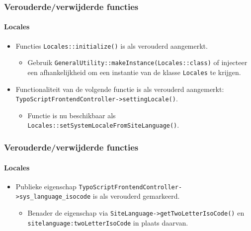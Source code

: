 \begin{frame}[fragile]
	\frametitle{Verouderde/verwijderde functies}
	\framesubtitle{Locales}

	\begin{itemize}
		\item Functies \texttt{Locales::initialize()} is als verouderd aangemerkt.

			\begin{itemize}\smaller
				\item[\ding{228}] Gebruik \texttt{GeneralUtility::makeInstance(Locales::class)} of
				injecteer een afhankelijkheid om een instantie van de klasse \texttt{Locales} te krijgen.
			\end{itemize}\normalsize

		\item Functionaliteit van de volgende functie is als verouderd aangemerkt:\newline
			\texttt{TypoScriptFrontendController->settingLocale()}.

			\begin{itemize}\smaller
				\item[\ding{228}] Functie is nu beschikbaar als
				{\fontsize{8}{8} \selectfont \texttt{Locales::setSystemLocaleFromSiteLanguage()}.}
			\end{itemize}\normalsize

	\end{itemize}

\end{frame}


\begin{frame}[fragile]
	\frametitle{Verouderde/verwijderde functies}
	\framesubtitle{Locales}

	\begin{itemize}
		\item Publieke eigenschap \texttt{TypoScriptFrontendController->sys\_language\_isocode}
			is als verouderd gemarkeerd.

			\begin{itemize}\smaller
				\item[\ding{228}] Benader de eigenschap via \texttt{SiteLanguage->getTwoLetterIsoCode()}
				en \texttt{sitelanguage:twoLetterIsoCode} in plaats daarvan.
			\end{itemize}\normalsize

	\end{itemize}

\end{frame}

